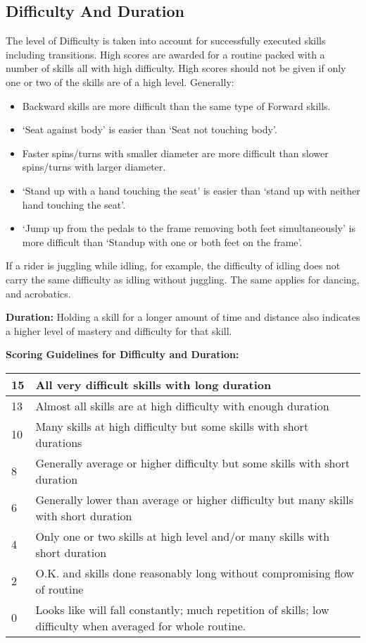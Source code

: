 \subsection{Difficulty And Duration}
The level of Difficulty is taken into account for successfully executed skills including transitions.
High scores are awarded for a routine packed with a number of skills all with high difficulty.
High scores should not be given if only one or two of the skills are of a high level.
Generally:
\begin{itemize} 
\item Backward skills are more difficult than the same type of Forward skills.
\item `Seat against body' is easier than `Seat not touching body'.
\item Faster spins/turns with smaller diameter are more difficult than slower spins/turns with larger diameter.
\item `Stand up with a hand touching the seat' is easier than `stand up with neither hand touching the seat'.
\item `Jump up from the pedals to the frame removing both feet simultaneously' is more difficult than `Standup with one or both feet on the frame'.
\end{itemize}
If a rider is juggling while idling, for example, the difficulty of idling does not carry the same difficulty as idling without juggling.
The same applies for dancing, and acrobatics.

\textbf{Duration:} Holding a skill for a longer amount of time and distance also indicates a higher level of mastery and difficulty for that skill.

\begin{minipage}{\textwidth}
\textbf{Scoring Guidelines for Difficulty and Duration:} \\

\begin{tabular}{|l|p{12.5cm}|}
\hline
15 & All very difficult skills with long duration \\
\hline
13 & Almost all skills are at high difficulty with enough duration \\
\hline
10 & Many skills at high difficulty but some skills with short durations \\
\hline
8 & Generally average or higher difficulty but some skills with short duration \\
\hline
6 & Generally lower than average or higher difficulty but many skills with short duration \\
\hline
4 & Only one or two skills at high level and/or many skills with short duration \\
\hline
2 & O.K. and skills done reasonably long without compromising flow of routine \\
\hline
0 & Looks like will fall constantly; much repetition of skills; low difficulty when averaged for whole routine. \\
\hline
\end{tabular}
\end{minipage}

